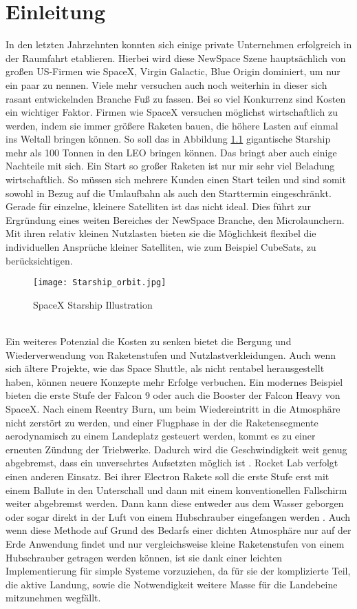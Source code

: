 \chapter{Einleitung}

In den letzten Jahrzehnten konnten sich einige private Unternehmen erfolgreich in der Raumfahrt etablieren. Hierbei wird diese NewSpace Szene hauptsächlich von großen US-Firmen wie SpaceX, Virgin Galactic, Blue Origin dominiert, um nur ein paar zu nennen. Viele mehr versuchen auch noch weiterhin in dieser sich rasant entwickelnden Branche Fuß zu fassen. Bei so viel Konkurrenz sind Kosten ein wichtiger Faktor. Firmen wie SpaceX versuchen möglichst wirtschaftlich zu werden, indem sie immer größere Raketen bauen, die höhere Lasten auf einmal ins Weltall bringen können. So soll das in Abbildung \ref{abb_BFR} gigantische Starship mehr als 100 Tonnen in den \gls{LEO} \cite{starShipUserGuide} bringen können. Das bringt aber auch einige Nachteile mit sich. Ein Start so großer Raketen ist nur mir sehr viel Beladung wirtschaftlich. So müssen sich mehrere Kunden einen Start teilen und sind somit sowohl in Bezug auf die Umlaufbahn als auch den Starttermin eingeschränkt. Gerade für einzelne, kleinere Satelliten ist das nicht ideal. Dies führt zur Ergründung eines weiten Bereiches der NewSpace Branche, den Microlaunchern. Mit ihren relativ kleinen Nutzlasten bieten sie die Möglichkeit flexibel die individuellen Ansprüche kleiner Satelliten, wie zum Beispiel CubeSats, zu berücksichtigen.
\begin{figure}[h]
	\centering
	\texttt{[image: Starship\_orbit.jpg]}
	\caption{SpaceX Starship Illustration}
	\label{abb_BFR}
\end{figure}\\
Ein weiteres Potenzial die Kosten zu senken bietet die Bergung und Wiederverwendung von Raketenstufen und Nutzlastverkleidungen. Auch wenn sich ältere Projekte, wie das Space Shuttle, als nicht rentabel herausgestellt haben, können neuere Konzepte mehr Erfolge verbuchen. Ein modernes Beispiel bieten die erste Stufe der Falcon 9 oder auch die Booster der Falcon Heavy von SpaceX. Nach einem Reentry Burn, um beim Wiedereintritt in die Atmosphäre nicht zerstört zu werden, und einer Flugphase in der die Raketensegmente aerodynamisch zu einem Landeplatz gesteuert werden, kommt es zu einer erneuten Zündung der Triebwerke. Dadurch wird die Geschwindigkeit weit genug abgebremst, dass ein unversehrtes Aufsetzten möglich ist \cite{falconUserGuide}.
Rocket Lab verfolgt einen anderen Einsatz. Bei ihrer Electron Rakete soll die erste Stufe erst mit einem Ballute in den Unterschall und dann mit einem konventionellen Fallschirm weiter abgebremst werden. Dann kann diese entweder aus dem Wasser geborgen oder sogar direkt in der Luft von einem Hubschrauber eingefangen werden \cite{electronRocketLab}. Auch wenn diese Methode auf Grund des Bedarfs einer dichten Atmosphäre nur auf der Erde Anwendung findet und nur vergleichsweise kleine Raketenstufen von einem Hubschrauber getragen werden können, ist sie dank einer leichten Implementierung für simple Systeme vorzuziehen, da für sie der komplizierte Teil, die aktive Landung, sowie die Notwendigkeit weitere Masse für die Landebeine mitzunehmen wegfällt.
